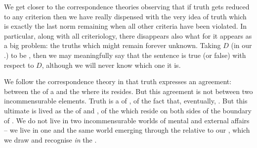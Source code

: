 We get closer to the correspondence theories observing that if truth gets reduced to any
criterion then we have really dispensed with the very idea of truth which is
exactly the last norm remaining when all other criteria have been violated.
In particular, along with all criteriology, there disappears also what for it
appears as a big problem: the 
truths which might remain forever unknown.  Taking $D$ (in our  
.) to be , then we may meaningfully say that the
sentence 
is true (or false) with respect to  $D$, although we will never know which one it is.

We follow the correspondence theory in that truth expresses an agreement:
between the  of a  and the  where its
 resides. But this agreement is not between two incommensurable
elements. Truth is a  of , of the fact that,
eventually, . But this ultimate  is
lived as the  of  and , of the
 which reside on both sides of the boundary of .
We do not live in two incommensurable worlds of mental and external affairs --
we live in one and the same world emerging through the
 relative to our , which we draw and recognise
{\em in} the . 


